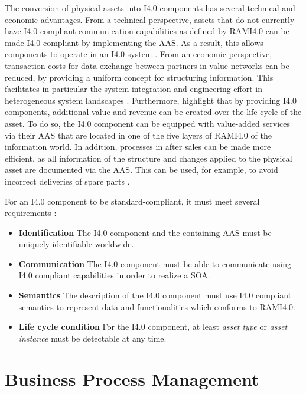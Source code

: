 The conversion of physical assets into \ac{I4.0} components has several technical and economic advantages. From a technical perspective, assets that do not currently have \ac{I4.0} compliant communication capabilities as defined by \ac{RAMI4.0} can be made \ac{I4.0} compliant by implementing the \ac{AAS}. As a result, this allows components to operate in an \ac{I4.0} system \cite[p. 1005]{Birtel2019FutureFit:Approach}. From an economic perspective, transaction costs for data exchange between partners in value networks can be reduced, by providing a uniform concept for structuring information. This facilitates in particular the system integration and engineering effort in heterogeneous system landscapes \cite[p. 324]{Lachenmaier2019entwicklung}. Furthermore,  \citet[p. 325]{Lachenmaier2019entwicklung} highlight that by providing \ac{I4.0} components, additional value and revenue can be created over the life cycle of the asset. To do so, the \ac{I4.0} component can be equipped with value-added services via their \ac{AAS} that are located in one of the five layers of \ac{RAMI4.0} of the information world. In addition, processes in after sales can be made more efficient, as all information of the structure and changes applied to the physical asset are documented via the \ac{AAS}. This can be used, for example, to avoid incorrect deliveries of spare parts \citet[p. 329]{Lachenmaier2019entwicklung}.

For an \ac{I4.0} component to be standard-compliant, it must meet several requirements \cite[p. 1]{Koschnick2015Die4.0-Komponente}:
\begin{itemize}
    \item \textbf{Identification} The \ac{I4.0} component and the containing \ac{AAS} must be uniquely identifiable worldwide.
    \item \textbf{Communication} The \ac{I4.0} component must be able to communicate using \ac{I4.0} compliant capabilities in order to realize a \ac{SOA}.
    \item \textbf{Semantics} The description of the \ac{I4.0} component must use \ac{I4.0} compliant semantics to represent data and functionalities which conforms to \ac{RAMI4.0}.
    \item \textbf{Life cycle condition} For the \ac{I4.0} component, at least \textit{asset type} or \textit{asset instance} must be detectable at any time.
\end{itemize}

\section{Business Process Management}











